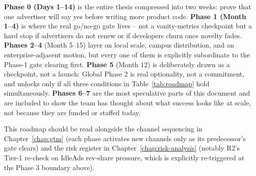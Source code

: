 \textbf{Phase 0 (Days 1--14)} is the entire thesis compressed into two weeks: prove that one advertiser will say yes before writing more product code. \textbf{Phase 1 (Month 1--4)} is where the real go/no-go gate lives -- not a vanity-metrics checkpoint but a hard stop if advertisers do not renew or if developers churn once novelty fades. \textbf{Phases 2--4} (Month 5--15) layer on local scale, campus distribution, and an enterprise-adjacent motion, but every one of them is explicitly subordinate to the Phase-1 gate clearing first. \textbf{Phase 5} (Month 12) is deliberately drawn as a checkpoint, not a launch: Global Phase 2 is real optionality, not a commitment, and unlocks only if all three conditions in Table~\ref{tab:roadmap} hold simultaneously. \textbf{Phases 6--7} are the most speculative parts of this document and are included to show the team has thought about what success looks like at scale, not because they are funded or staffed today.

This roadmap should be read alongside the channel sequencing in Chapter~\ref{chap:gtm} (each phase activates new channels only as its predecessor's gate clears) and the risk register in Chapter~\ref{chap:risk-analysis} (notably R2's Tier-1 re-check on IdleAds rev-share pressure, which is explicitly re-triggered at the Phase 3 boundary above).
